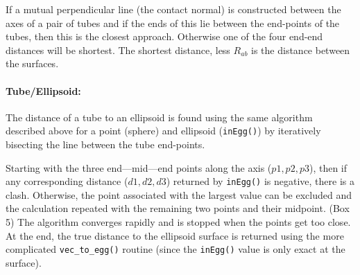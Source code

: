 {{{{{If a mutual perpendicular line (the contact normal) is constructed between the axes of a pair
of tubes and if the ends of this lie between the end-points of the tubes, then this is the
closest approach.   Otherwise one of the four end-end distances will be shortest.   The shortest
distance, less $R_{ab}$ is the distance between the surfaces.

\paragraph{Tube/Ellipsoid:\\}

The distance of a tube to an ellipsoid is found using the same algorithm described above
for a point (sphere) and ellipsoid ({\tt inEgg()}) by iteratively bisecting the line between the
tube end-points.

Starting with the three end---mid---end points along the axis ($p1,p2,p3$), then if any corresponding
distance ($d1,d2,d3$) returned by {\tt inEgg()} is negative, there is a clash.   Otherwise, the point
associated with the largest value can be excluded and the calculation repeated with the remaining
two points and their midpoint. (Box 5)   The algorithm converges rapidly and is stopped when the points
get too close.   At the end, the true distance to the ellipsoid surface is returned using the more
complicated {\tt vec\_to\_egg()} routine (since the {\tt inEgg()} value is only exact at the surface).

}}}}}
